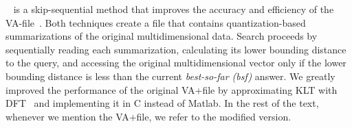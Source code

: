 ~\cite{conf/cikm/Hakan2000} is a skip-sequential method that improves the accuracy and efficiency of the VA-file~\cite{conf/vldb/Weber1998}. 
Both techniques create a file that contains quantization-based summarizations of the original multidimensional data. 
Search proceeds by sequentially reading each summarization, %
calculating its lower bounding distance to the query, and accessing the original multidimensional vector only if the lower bounding distance is less than the current \emph{best-so-far (bsf)} answer. 
We greatly improved the performance of the original VA+file by approximating KLT with DFT~\cite{conf/cikm/Hakan2000,journal/acta/maccone2007} and implementing it in C instead of Matlab. 
In the rest of the text, whenever we mention the VA+file, we refer to the modified version.







